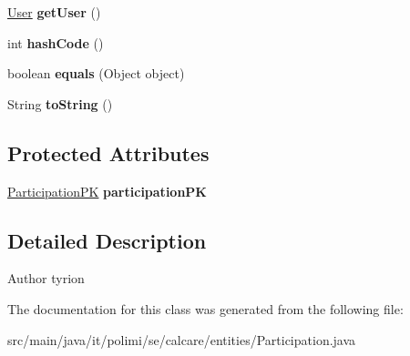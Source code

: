 \begin{DoxyCompactItemize}
\item 
\hypertarget{classit_1_1polimi_1_1se_1_1calcare_1_1entities_1_1Participation_a70475620dcf88a8623c7d6ecf01c6ed8}{}\hyperlink{classit_1_1polimi_1_1se_1_1calcare_1_1entities_1_1User}{User} {\bfseries get\+User} ()\label{classit_1_1polimi_1_1se_1_1calcare_1_1entities_1_1Participation_a70475620dcf88a8623c7d6ecf01c6ed8}

\item 
\hypertarget{classit_1_1polimi_1_1se_1_1calcare_1_1entities_1_1Participation_a334e522c225615fbdaa62ace08dbbe2d}{}int {\bfseries hash\+Code} ()\label{classit_1_1polimi_1_1se_1_1calcare_1_1entities_1_1Participation_a334e522c225615fbdaa62ace08dbbe2d}

\item 
\hypertarget{classit_1_1polimi_1_1se_1_1calcare_1_1entities_1_1Participation_ae639c999f0406771378a8a38ebaf512c}{}boolean {\bfseries equals} (Object object)\label{classit_1_1polimi_1_1se_1_1calcare_1_1entities_1_1Participation_ae639c999f0406771378a8a38ebaf512c}

\item 
\hypertarget{classit_1_1polimi_1_1se_1_1calcare_1_1entities_1_1Participation_a065698dc991ca94224b7c2d1ba54f874}{}String {\bfseries to\+String} ()\label{classit_1_1polimi_1_1se_1_1calcare_1_1entities_1_1Participation_a065698dc991ca94224b7c2d1ba54f874}

\end{DoxyCompactItemize}
\subsection*{Protected Attributes}
\begin{DoxyCompactItemize}
\item 
\hypertarget{classit_1_1polimi_1_1se_1_1calcare_1_1entities_1_1Participation_a050a2c5040fc31b205ddf57a940bc8b4}{}\hyperlink{classit_1_1polimi_1_1se_1_1calcare_1_1entities_1_1ParticipationPK}{Participation\+P\+K} {\bfseries participation\+P\+K}\label{classit_1_1polimi_1_1se_1_1calcare_1_1entities_1_1Participation_a050a2c5040fc31b205ddf57a940bc8b4}

\end{DoxyCompactItemize}


\subsection{Detailed Description}
\begin{DoxyAuthor}{Author}
tyrion 
\end{DoxyAuthor}


The documentation for this class was generated from the following file\+:\begin{DoxyCompactItemize}
\item 
src/main/java/it/polimi/se/calcare/entities/Participation.\+java\end{DoxyCompactItemize}
